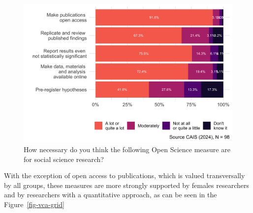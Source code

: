 \documentclass[
  letterpaper,
  DIV=11,
  numbers=noendperiod]{scrartcl}
\begin{document}
\begin{figure}[H]

{\centering \includegraphics{paper_files/figure-pdf/fig-val-1.png}

}

\caption{\label{fig-val}How necessary do you think the following Open
Science measure are for social science research?}

\end{figure}

With the exception of open access to publications, which is valued
transversally by all groups, these measures are more strongly supported
by females researchers and by researchers with a quantitative approach,
as can be seen in the Figure~\ref{fig-vca-grid}
\end{document}
